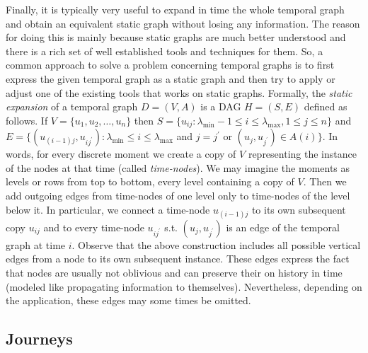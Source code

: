 \documentclass[oribibl, 11pt]{llncs}
\begin{document}
Finally, it is typically very useful to expand in time the whole temporal graph and obtain an equivalent static graph without losing any information. The reason for doing this is mainly because static graphs are much better understood and there is a rich set of well established tools and techniques for them. So, a common approach to solve a problem concerning temporal graphs is to first express the given temporal graph as a static graph and then try to apply or adjust one of the existing tools that works on static graphs. Formally, the \emph{static expansion} of a temporal graph $D=(V,A)$ is a DAG $H=(S,E)$ defined as follows. If $V=\{u_1,u_2,\ldots,u_n\}$ then $S= \{u_{ij}: \lambda_{\min}-1\leq i\leq \lambda_{\max},1\leq j\leq n\}$ and $E=\{(u_{(i-1)j},u_{ij^\prime}):\lambda_{\min}\leq i\leq \lambda_{\max}$ and $j=j^\prime$ or $(u_j,u_{j^\prime})\in A(i)\}$. In words, for every discrete moment we create a copy of $V$ representing the instance of the nodes at that time (called \emph{time-nodes}). We may imagine the moments as levels or rows from top to bottom, every level containing a copy of $V$. Then we add outgoing edges from time-nodes of one level only to time-nodes of the level below it. In particular, we connect a time-node $u_{(i-1)j}$ to its own subsequent copy $u_{ij}$ and to every time-node $u_{ij^\prime}$ s.t. $(u_j,u_{j^\prime})$ is an edge of the temporal graph at time $i$. Observe that the above construction includes all possible vertical edges from a node to its own subsequent instance. These edges express the fact that nodes are usually not oblivious and can preserve their on history in time (modeled like propagating information to themselves). Nevertheless, depending on the application, these edges may some times be omitted. 

\subsection{Journeys}
\label{subsec:journeys}
\end{document}
